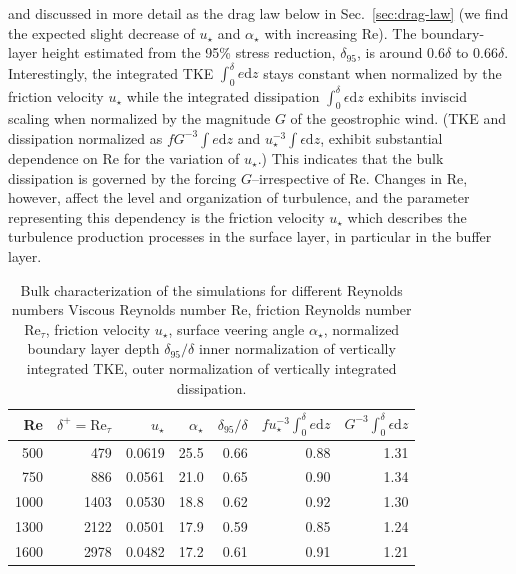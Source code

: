 \documentclass[a4paper,11pt]{amsart}
\newcommand{\RE}{\mathrm{Re}}
\begin{document}
and discussed in more detail as the drag law below in Sec.~\ref{sec:drag-law}
(we find the expected slight decrease of $u_\star$ and $\alpha_\star$ with increasing $\RE$).
%
The boundary-layer height estimated from the 95\% stress reduction, $\delta_{95}$, is around $0.6\delta$ to $0.66\delta$. 
%
Interestingly, the integrated TKE $\int_{0}^{\delta} e\mathrm{d}z$ stays constant when normalized by the friction velocity $u_\star$
while the integrated dissipation $\int_{0}^{\delta} \epsilon\mathrm{d}z$ exhibits inviscid scaling when normalized
by the magnitude $G$ of the geostrophic wind. 
%
(TKE and dissipation normalized as
$f G^{-3} \int e \mathrm{d} z$ and $u_\star^{-3} \int \epsilon\mathrm{d}z$, exhibit substantial
dependence on $\RE$ for the variation of $u_\star$.)
%
This indicates that the bulk dissipation is governed by the forcing $G$--irrespective of $\RE$. 
%
Changes in $\RE$, however, affect the level and organization of turbulence, and the parameter
representing this dependency is the friction velocity $u_\star$ which describes the turbulence
production processes in the surface layer, in particular in the buffer layer. 
% 
\begin{table}
  \caption{Bulk characterization of the simulations for different Reynolds numbers 
    Viscous Reynolds number $\RE$,
    friction Reynolds number  $\RE_\tau$,
    friction velocity $u_\star$,
    surface veering angle $\alpha_\star$,
    normalized boundary layer depth $\delta_{95}/\delta$
    inner normalization of vertically integrated TKE,
    outer normalization of vertically integrated dissipation.
    \label{tab:bulk_results}}
  \begin{tabular}{r r r r r r r }
    \toprule
    Re & $\delta^+=\RE_\tau$& $u_\star$ & $\alpha_\star$ & $\delta_{95}/\delta$ & $f u_\star^{-3}\int_{0}^{\delta} e \mathrm{d} z $ & $ G^{-3}\int_{0}^{\delta} \epsilon \mathrm{d}z$\\
      \midrule 
      \rowcolor{gray!30} 
      500 & 479 & 0.0619& 25.5 & 0.66& 0.88& 1.31 \\
      \rowcolor{gray!30} 
      750 & 886 & 0.0561& 21.0 & 0.65& 0.90& 1.34 \\
      \rowcolor{gray!30}
      1000& 1403& 0.0530& 18.8 & 0.62& 0.92& 1.30 \\
      \midrule
      1300& 2122& 0.0501& 17.9 & 0.59& 0.85& 1.24 \\
      1600& 2978& 0.0482& 17.2 & 0.61& 0.91& 1.21 \\ 
      \bottomrule
    \end{tabular}
\end{table} 
\end{document}
